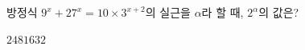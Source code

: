 방정식 $9^x+27^x=10\times 3^{x+2}$의 실근을 $\alpha$라 할 때, $2^\alpha$의 값은?
\begin{choices32}{$2$}{$4$}{$8$}{$16$}{$32$}\end{choices32}
